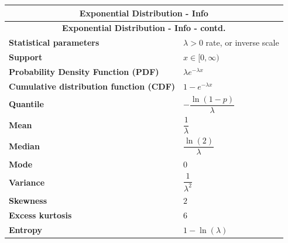 \renewcommand{\arraystretch}{2}
\begin{longtable}{|m{6cm}|p{9cm}|}
    \hline
    \multicolumn{2}{|c|}{\textbf{Exponential Distribution - Info} \cite{wiki/Exponential_distribution}} \\
    \hline\endfirsthead

    \hline
    \multicolumn{2}{|c|}{\textbf{Exponential Distribution - Info - contd.} \cite{wiki/Exponential_distribution}} \\
    \hline\endhead
    
    \hline\endfoot
    \hline\endlastfoot

    \textbf{Statistical parameters} & 
    ${\displaystyle \lambda >0}$ rate, or inverse scale
    \\ \hline
    
    \textbf{Support} &
    ${\displaystyle x\in [0,\infty )}$
    \\ \hline

    \textbf{Probability Density Function (PDF)} & 
    ${\displaystyle \lambda e^{-\lambda x}}$
    \\[1ex] \hline
    
    \textbf{Cumulative distribution function (CDF)} & 
    ${\displaystyle 1-e^{-\lambda x}}$
    \\ \hline

    \textbf{Quantile} &
    ${\displaystyle -{\dfrac {\ln(1-p)}{\lambda }}}$
    \\ \hline

    \textbf{Mean} & 
    ${\displaystyle {\dfrac {1}{\lambda }}}$
    \\[1ex] \hline

    \textbf{Median} & 
    ${\displaystyle {\dfrac {\ln (2)}{\lambda }}}$
    \\[1ex] \hline

    \textbf{Mode} & 
    $0$
    \\ \hline

    \textbf{Variance} &
    ${\displaystyle {\dfrac {1}{\lambda ^{2}}}}$
    \\[1ex] \hline

    \textbf{Skewness} &
    $2$
    \\ \hline

    \textbf{Excess kurtosis} &
    $6$
    \\ \hline

    \textbf{Entropy} &
    ${\displaystyle 1-\ln (\lambda) }$
    \\[1ex] \hline


\end{longtable}
